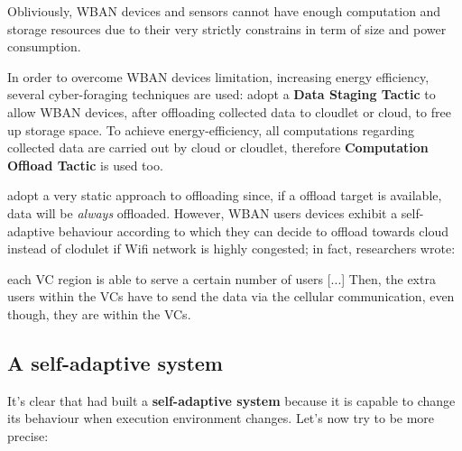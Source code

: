 \documentclass[sigchi]{acmart}
\begin{document}
\vspace{0.3cm}

Obliviously, WBAN devices and sensors cannot have enough computation and storage resources due to their very strictly constrains in term of size and power consumption. 

In order to overcome WBAN devices limitation, increasing energy efficiency, several cyber-foraging techniques are used: \citet{MSAReport} adopt a \textbf{Data Staging Tactic} to allow WBAN devices, after oﬄoading collected data to cloudlet or cloud, to free up storage space. To achieve energy-efficiency, all computations regarding collected data are carried out by cloud or cloudlet, therefore \textbf{Computation Offload Tactic} is used too.

\citet{MSAReport} adopt a very static approach to offloading since, if a offload target is available, data will be \textit{always} offloaded. 
However, WBAN users devices exhibit a self-adaptive behaviour according to which they can decide to offload towards cloud instead of clodulet if Wifi network is highly congested; in fact, researchers wrote:

\vspace{0.3cm}

\begin{quoting}[font=itshape, begintext={``}, endtext={''\cite[par.~5.1]{MSAReport}}]
each VC region is able to serve a certain number of users [...] Then, the extra users within the VCs have to send the data via the cellular communication, even though, they are within the VCs. 
\end{quoting}

\vspace{0.3cm}

\subsection{A self-adaptive system}

It's clear that \citet{MSAReport} had built a \textbf{self-adaptive system} because it is capable to change its behaviour when execution environment changes. Let's now try to be more precise:
\end{document}
